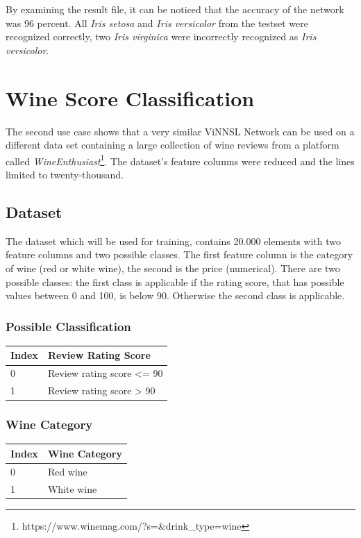 By examining the result file, it can be noticed that the accuracy of the
network was 96 percent. All \emph{Iris setosa} and \emph{Iris
versicolor} from the testset were recognized correctly, two \emph{Iris
virginica} were incorrectly recognized as \emph{Iris versicolor}.

\section{Wine Score Classification}\label{wine-score-classification}

The second use case shows that a very similar ViNNSL Network can be used
on a different data set containing a large collection of wine reviews
from a platform called \emph{WineEnthusiast}\footnote{https://www.winemag.com/?s=\&drink\_type=wine}.
The dataset's feature columns were reduced and the lines limited to
twenty-thousand.

\subsection{Dataset}\label{dataset-1}

The dataset which will be used for training, contains 20.000 elements
with two feature columns and two possible classes. The first feature
column is the category of wine (red or white wine), the second is the
price (numerical). There are two possible classes: the first class is
applicable if the rating score, that has possible values between 0 and
100, is below 90. Otherwise the second class is applicable.

\subsubsection{Possible Classification}\label{possible-classification}

\begin{longtable}[]{@{}ll@{}}
\toprule
Index & Review Rating Score\tabularnewline
\midrule
\endhead
0 & Review rating score \textless{}= 90\tabularnewline
1 & Review rating score \textgreater{} 90\tabularnewline
\bottomrule
\end{longtable}

\subsubsection{Wine Category}\label{wine-category}

\begin{longtable}[]{@{}ll@{}}
\toprule
Index & Wine Category\tabularnewline
\midrule
\endhead
0 & Red wine\tabularnewline
1 & White wine\tabularnewline
\bottomrule
\end{longtable}

